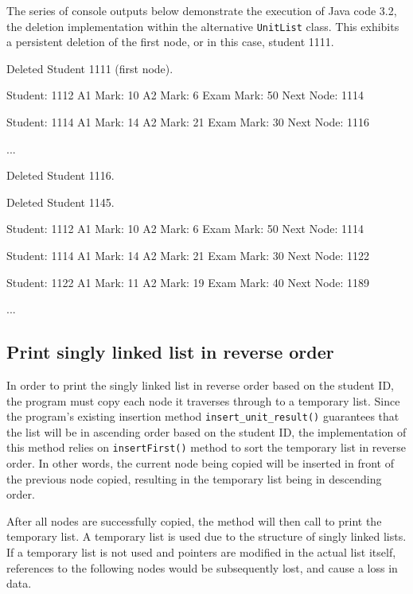 \newpage
\noindent
The series of console outputs below demonstrate the execution of Java code 3.2, the deletion implementation within the alternative \texttt{UnitList} class. This exhibits a persistent deletion of the first node, or in this case, student 1111.
\\
\begin{consolecode}
Deleted Student 1111 (first node).

Student: 1112
A1 Mark: 10
A2 Mark: 6
Exam Mark: 50
Next Node: 1114

Student: 1114
A1 Mark: 14
A2 Mark: 21
Exam Mark: 30
Next Node: 1116

...
\end{consolecode}

\begin{consolecode}
Deleted Student 1116.

Deleted Student 1145.

Student: 1112
A1 Mark: 10
A2 Mark: 6
Exam Mark: 50
Next Node: 1114

Student: 1114
A1 Mark: 14
A2 Mark: 21
Exam Mark: 30
Next Node: 1122

Student: 1122
A1 Mark: 11
A2 Mark: 19
Exam Mark: 40
Next Node: 1189

...
\end{consolecode}

\subsection{Print singly linked list in reverse order}

In order to print the singly linked list in reverse order based on the student ID, the program must copy each node it traverses through to a temporary list. Since the program's existing insertion method \texttt{insert_unit_result()} guarantees that the list will be in ascending order based on the student ID, the implementation of this method relies on \texttt{insertFirst()} method to sort the temporary list in reverse order. In other words, the current node being copied will be inserted in front of the previous node copied, resulting in the temporary list being in descending order.

After all nodes are successfully copied, the method will then call to print the temporary list. A temporary list is used due to the structure of singly linked lists. If a temporary list is not used and pointers are modified in the actual list itself, references to the following nodes would be subsequently lost, and cause a loss in data.


